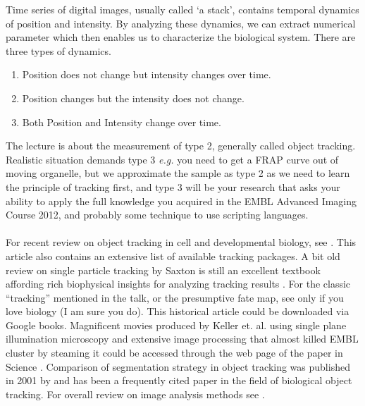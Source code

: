 \documentclass[11pnt]{article}
\begin{document}
Time series of digital images, usually called ‘a stack’, contains temporal dynamics of position and intensity. By analyzing these dynamics, we can extract numerical parameter which then enables us to characterize the biological system. There are three types of dynamics. 
\begin{enumerate}
\item Position does not change but intensity changes over time. 
\item Position changes but the intensity does not change. 
\item Both Position and Intensity change over time. 
\end{enumerate}
The lecture is about the measurement of type 2, generally called object tracking. Realistic situation demands type 3 \textit{e.g.} you need to get a FRAP curve out of moving organelle, but we approximate the sample as type 2 as we need to learn the principle of tracking first, and type 3 will be your research that asks your ability to apply the full knowledge you acquired in the EMBL Advanced Imaging Course 2012, and probably some technique to use scripting languages.  
\\
\\
For recent review on object tracking in cell and developmental biology, see \cite{Meijering2012}. This article also contains an extensive list of available tracking packages. A bit old review on single particle tracking by Saxton is still an excellent textbook affording rich biophysical insights for analyzing tracking results \citep{Saxton1997}. For the classic ``tracking'' mentioned in the talk, or the presumptive fate map, see \cite{Vogt1925} only if you love biology (I am sure you do). This historical article could be downloaded via Google books. Magnificent movies produced by Keller et. al. using single plane illumination microscopy and extensive image processing that almost killed EMBL cluster by steaming it could be accessed through the web page of the paper in Science \citep{Keller2008}. Comparison of segmentation strategy in object tracking was published in 2001 by \cite{Cheezum2001a} and has been a frequently cited paper in the field of biological object tracking. For overall review on image analysis methods see \cite{Hamilton2009}.
\end{document}

